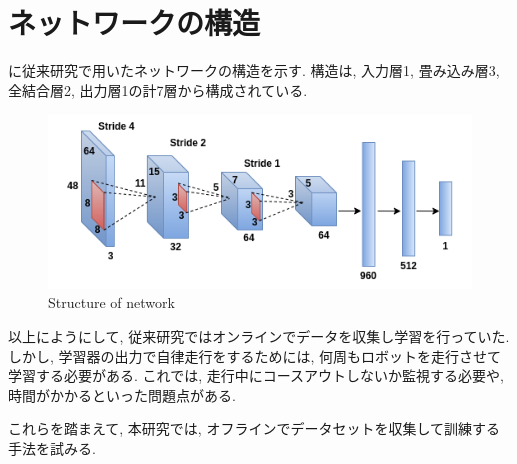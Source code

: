 \newpage
\section{ネットワークの構造}
に従来研究で用いたネットワークの構造を示す. 構造は, 入力層1, 畳み込み層3, 全結合層2, 出力層1の計7層から構成されている.

\begin{figure}[h]
  \centering
  \includegraphics[keepaspectratio, scale=0.6]{images/cnn.png}
  \caption{Structure of network}
  \label{Fig:cnn}
  \end{figure}

以上にようにして, 従来研究ではオンラインでデータを収集し学習を行っていた. しかし, 学習器の出力で自律走行をするためには, 何周もロボットを走行させて学習する必要がある. これでは, 走行中にコースアウトしないか監視する必要や, 時間がかかるといった問題点がある. \par これらを踏まえて, 本研究では, オフラインでデータセットを収集して訓練する手法を試みる. 

